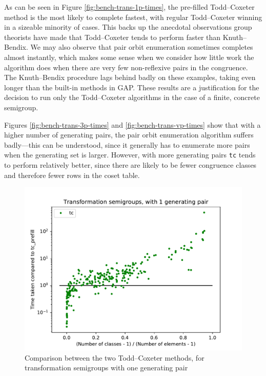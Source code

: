 As can be seen in Figure \ref{fig:bench-trans-1p-times}, the pre-filled Todd--Coxeter
method is the most likely to complete fastest, with regular Todd--Coxeter winning
in a sizeable minority of cases.  This backs up the anecdotal observations group
theorists have made \cite{havascomparing} that Todd--Coxeter tends to perform
faster than Knuth--Bendix.  We may also observe that pair orbit enumeration
sometimes completes almost instantly, which makes some sense when we consider
how little work the algorithm does when there are very few non-reflexive pairs
in the congruence.  The Knuth--Bendix procedure lags behind badly on these
examples, taking even longer than the built-in methods in GAP.  These results
are a justification for the decision to run only the Todd--Coxeter algorithms in
the case of a finite, concrete semigroup.

Figures \ref{fig:bench-trans-3p-times} and \ref{fig:bench-trans-vp-times} show
that with a higher number of generating pairs, the pair orbit enumeration
algorithm suffers badly---this can be understood, since it generally has to
enumerate more pairs when the generating set is larger.  However, with more
generating pairs \texttt{tc} tends to perform relatively better, since there are
likely to be fewer congruence classes and therefore fewer rows in the coset
table.

\begin{figure}[h]
  \centering
  \includegraphics[width=\textwidth]{pics/ch-pairs/bench-trans-tc-1p-tccomp}
  \caption[Benchmark: Todd--Coxeter, concrete, 1 pair]
  {Comparison between the two Todd--Coxeter methods, for transformation
    semigroups with one generating pair}
  \label{fig:bench-trans-tc-1p-tccomp}
\end{figure}

